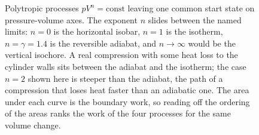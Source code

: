 \begin{figure}[htbp]
\centering
{}
\caption[Family of polytropic processes on pressure-volume axes]{Polytropic
processes $pV^n = \text{const}$ leaving one common start state on
pressure-volume axes. The exponent $n$ slides between the named limits:
$n=0$ is the horizontal isobar, $n=1$ is the isotherm, $n=\gamma=1.4$ is the
reversible adiabat, and $n\to\infty$ would be the vertical isochore. A real
compression with some heat loss to the cylinder walls sits between the
adiabat and the isotherm; the case $n=2$ shown here is steeper than the
adiabat, the path of a compression that loses heat faster than an adiabatic
one. The area under each curve is the boundary work, so reading off the
ordering of the areas ranks the work of the four processes for the same
volume change.}
\label{fig:vol04ch01:polytropic}
\end{figure}
